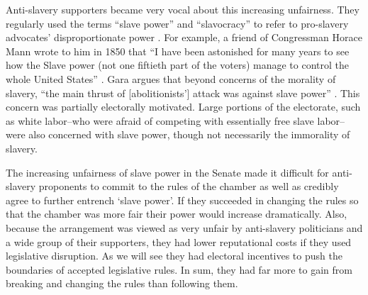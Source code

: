 \documentclass[a4paper]{article}\usepackage[]{graphicx}\usepackage[]{color}
\begin{document}
Anti-slavery supporters became very vocal about this increasing unfairness. They regularly used the terms ``slave power'' and ``slavocracy'' to refer to pro-slavery advocates' disproportionate power \citep{richards2000}. For example, a friend of Congressman Horace Mann wrote to him in 1850 that ``I have been astonished for many years to see how the Slave power (not one fiftieth part of the voters) manage to control the whole United States'' \citep[quoted in][6]{Gara1969}. Gara argues that beyond concerns of the morality of slavery, ``the main thrust of [abolitionists'] attack was against slave power'' \citeyearpar[6]{Gara1969}. This concern was partially electorally motivated. Large portions of the electorate, such as white labor--who were afraid of competing with essentially free slave labor--were also concerned with slave power, though not necessarily the immorality of slavery. 

The increasing unfairness of slave power in the Senate made it difficult for anti-slavery proponents to commit to the rules of the chamber as well as credibly agree to further entrench `slave power'. If they succeeded in changing the rules so that the chamber was more fair their power would increase dramatically. Also, because the arrangement was viewed as very unfair by anti-slavery politicians and a wide group of their supporters, they had lower reputational costs if they used legislative disruption. As we will see they had electoral incentives to push the boundaries of accepted legislative rules. In sum, they had far more to gain from breaking and changing the rules than following them.
\end{document}
